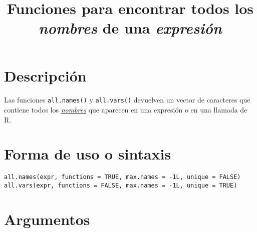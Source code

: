 \documentclass{article}[letter, 12pt]
\makeatletter
\def\code#1{\texttt{#1}}
\renewcommand{\maketitle}{\bgroup\setlength{\parindent}{0pt}
\begin{flushleft}
  \textbf{\@title}
  \@author
\end{flushleft}\egroup
}
\makeatother
\begin{document}
	\title{\Huge{Funciones para encontrar todos los \textit{nombres} de una \textit{expresión}}}
	\maketitle
	\section{\color{gray}Descripción}
	\paragraph{}
Las funciones \code{all.names()} y \code{all.vars()} devuelven un vector de caracteres que contiene todos los \href{run:/Vocabulary.pdf}{\textit{nombres}} que aparecen en una expresión o en una llamada de R.
\tableofcontents{}
\section{\color{gray}Forma de uso o sintaxis}
\code{all.names(expr, functions = TRUE, max.names = -1L, unique = FALSE)}\\
\code{all.vars(expr, functions = FALSE, max.names = -1L, unique = TRUE)}\\

\section{\color{gray}Argumentos}
\end{document}
